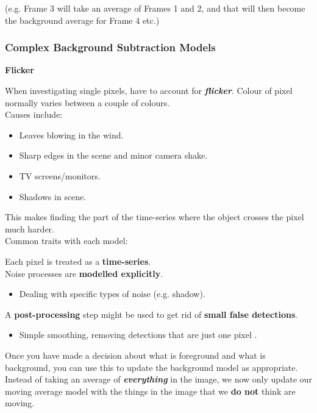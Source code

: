 \documentclass[english, 10pt]{article}
\begin{document}
(e.g. Frame 3 will take an average of Frames 1 and 2, and that will then become the background average for Frame 4 etc.)

\subsubsection{Complex Background Subtraction Models}

\textbf{Flicker}

When investigating single pixels, have to account for \textbf{\textit{flicker}}. Colour of pixel normally varies between a couple of colours. \\

Causes include:

\begin{itemize}
\item Leaves blowing in the wind.
\item Sharp edges in the scene and minor camera shake.
\item TV screens/monitors.
\item Shadows in scene.
\end{itemize}

This makes finding the part of the time-series where the object crosses the pixel much harder.\\

Common traits with each model:

Each pixel is treated as a \textbf{time-series}. \\

Noise processes are \textbf{modelled explicitly}.
\begin{itemize}
 \item Dealing with specific types of noise (e.g. shadow).
\end{itemize}

 A \textbf{post-processing} step might be used to get rid of \textbf{small false detections}.
\begin{itemize}
\item Simple smoothing, removing detections that are just one pixel .
\end{itemize}

Once you have made a decision about what is foreground and what is background, you can use this to update the background model as appropriate. \\

Instead of taking an average of \textit{\textbf{everything}} in the image, we now only update our moving average model with the things in the image that we \textbf{do not} think are moving. \\
\end{document}
